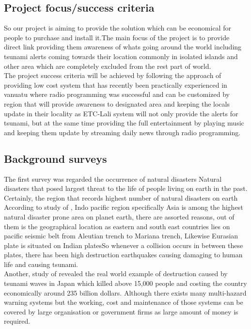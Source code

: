 \subsection{Project focus/success criteria}
So our project is aiming to provide the solution which can be economical for people to purchase and install it.The main focus of the project is to provide direct link providing them awareness of whats going around the world including tsunami alerts coming towards their location commonly in isolated islands and other area which are completely excluded from the rest part of world.\\

The project success criteria will be achieved by following the approach of providing low cost system that has recently been practically experienced in vanuatu where radio programming was successful and can be customized by region that will provide awareness to designated area and keeping the locals update in their locality as ETC-Lali system will not only provide the alerts for tsunami, but at the same time providing the full entertainment by playing music and keeping them update by streaming daily news through radio programming.



\subsection{ Background surveys}
The first survey was regarded the occurrence of natural disasters Natural disasters that posed largest threat to the life of people living on earth in the past. Certainly, the region that records highest number of natural disasters on earth\\

 According to study of \cite{kokai2004natural}, Indo pacific region specifically Asia is among the highest natural disaster prone area on planet earth, there are assorted reasons, out of them is the geographical location as eastern and south east countries lies   on pacific seismic belt  from Aleutian trench to Mariana trench, Likewise Eurasian plate is situated on Indian platesSo whenever a collision occurs in between these plates, there has been high destruction earthquakes causing damaging to human life and causing tsunami. \\

Another, study of \cite{thomas2013climate} revealed the real world example of destruction caused by tsunami waves in Japan which killed above 15,000 people and costing the country economically around 235 billion dollars. Although there exists many multi-hazard warning systems but the working, cost and maintenance of those systems can be covered by large organisation or government firms as large amount of money is required.\\

